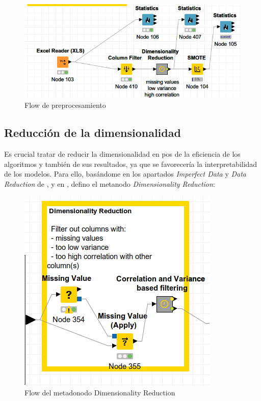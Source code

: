 \begin{figure}[H] %
	\centering
	\includegraphics[scale=0.6]{flow-prep.png}  %
	\caption{Flow de preprocesamiento} 
	\label{fig:flow-prep}
\end{figure}


\subsection{Reducción de la dimensionalidad}

Es crucial tratar de reducir la dimensionalidad en pos de la eficiencia de los algoritmos y también de sus resultados, ya que se favorecería la interpretabilidad de los modelos. Para ello, basándome en los apartados \textit{Imperfect Data} y \textit{Data Reduction} de \cite{preprocessing}, \cite{dr2} y en \cite{dr}, defino el metanodo \textit{Dimensionality Reduction}:

\begin{figure}[H] %
	\centering
	\includegraphics[scale=0.6]{flow-dr.png}  %
	\caption{Flow del metadonodo Dimensionality Reduction} 
	\label{fig:flow-dr}
\end{figure}

